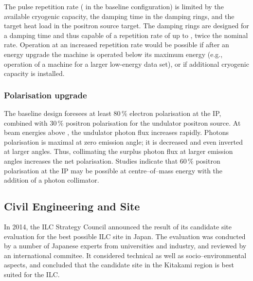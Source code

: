 The pulse repetition rate ( in the baseline configuration) is limited by the available cryogenic capacity, the damping time in the damping rings, and the target heat load in the positron source target.
The damping rings are designed for a  damping time and thus capable of a repetition rate of up to , twice the nominal rate.
Operation at an increased repetition rate would be possible if after an energy upgrade the machine is operated below its maximum energy (e.g.,  operation of a  machine for a larger low-energy data set), or if additional cryogenic capacity is installed.

\subsubsection{Polarisation upgrade}
\label{subsubsec:upg-optP}

The baseline design foresees at least $80\,\%$ electron polarisation at the IP, combined with $30\,\%$ positron polarisation for the undulator positron source.
At beam energies above , the undulator photon flux increases rapidly. 
Photons polarisation is maximal at zero emission angle; it is decreased and even inverted at larger angles.
Thus, collimating the surplus photon flux at larger emission angles increases the net polarisation. 
Studies indicate that $60\,\%$ positron polarisation at the IP may be possible at  centre--of--mass energy with the addition of a photon collimator.
 



\subsection{Civil Engineering and Site}


In 2014, the ILC Strategy Council announced the result of its candidate site evaluation for the best possible ILC site in Japan\cite{ILCSC:2014a}.
The evaluation was conducted by a number of Japanese experts from universities and industry, and reviewed by an international commitee. 
It considered technical as well as socio--environmental aspects, and concluded that the candidate site in the Kitakami region is best suited for the ILC.


